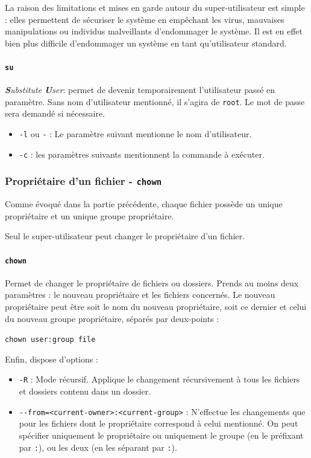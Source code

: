 La raison des limitations et mises en garde autour du super-utilisateur est simple : elles permettent de sécuriser le système en empêchant les virus, mauvaises manipulations ou individus malveillants d'endommager le système. Il est en effet bien plus difficile d'endommager un système en tant qu'utilisateur standard.

\paragraph{\texttt{su}} 
\textit{\textbf{S}ubstitute \textbf{U}ser}: permet de devenir temporairement l'utilisateur passé en paramètre. Sans nom d'utilisateur mentionné, il s'agira de \texttt{root}. Le mot de passe sera demandé si nécessaire.
\begin{itemize}
    \item \texttt{-l} ou \texttt{-} : Le paramètre suivant mentionne le nom d'utilisateur.
    \item \texttt{-c} : les paramètres suivants mentionnent la commande à exécuter.
\end{itemize}\vspace{\baselineskip}


\subsubsection{Propriétaire d'un fichier - \texttt{chown}}

Comme évoqué dans la partie précédente, chaque fichier possède un unique propriétaire et un unique groupe propriétaire.

Seul le super-utilisateur peut changer le propriétaire d'un fichier.

\paragraph{\texttt{chown}}  
Permet de changer le propriétaire de fichiers ou dossiers. Prends au moins deux paramètres : le nouveau propriétaire et les fichiers concernés.
Le nouveau propriétaire peut être soit le nom du nouveau propriétaire, soit ce dernier et celui du nouveau groupe propriétaire, séparés par deux-points : 
\begin{nscenter}
    \texttt{chown user:group file}
\end{nscenter}

Enfin,  dispose d'options : 
\begin{itemize}
    \item \texttt{-R} : Mode récursif. Applique le changement récursivement à tous les fichiers et dossiers contenu dans un dossier.
    \item \texttt{-{}-from=<current-owner>:<current-group>} : N'effectue les changements que pour les fichiers dont le propriétaire correspond à celui mentionné. On peut spécifier uniquement le propriétaire ou uniquement le groupe (en le préfixant par \texttt{:}), ou les deux (en les séparant par \texttt{:}).
\end{itemize}\vspace{\baselineskip}


